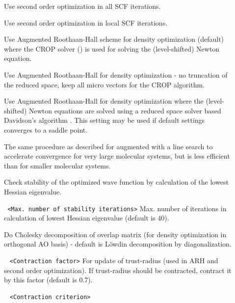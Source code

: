 \begin{description}
\item[] Use second order optimization in all SCF iterations.
\item[] Use second order optimization in local SCF iterations.
\item[] Use Augmented Roothaan-Hall scheme for density optimization 
(default)~\cite{ARH1,ARH2} where the CROP solver (\cite{crop}) is used for 
solving the (level-shifted) Newton equation. 
\item[] Use Augmented Roothaan-Hall for density optimization -
no truncation of the reduced space, keep all micro vectors for the CROP algorithm. 
\item[] Use Augmented Roothaan-Hall for density optimization where
the (level-shifted) Newton equations are solved using a reduced space solver based 
Davidson's algorithm \cite{davidson:1975}. This setting may be used if default settings  
converges to a saddle point. 
 \item[] The same procedure as described for  
augmented with a line search to accelerate convergence for very large molecular 
systems, but is less efficient than  for smaller molecular systems. 
\item[] Check stability of the optimized wave function by calculation
of the lowest Hessian eigenvalue. 
\item[] \verb| | \newline
\verb|<Max. number of stability iterations>|\newline
Max. number of iterations in calculation of lowest Hessian eigenvalue (default is 40).
\item[] Do Cholesky decomposition of overlap matrix (for density optimization
in orthogonal AO basis) - default is L{\"o}wdin decomposition by diagonalization.
\item[] \verb| | \newline
\verb|<Contraction factor>|\newline 
For update of trust-radius (used in ARH and second order optimization). If trust-radius
should be contracted,
contract it by this factor (default is 0.7).
\item[] \verb| | \newline
\verb|<Contraction criterion>|\newline 

\end{description}
